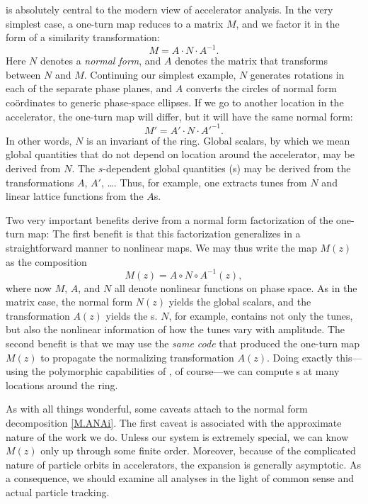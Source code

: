 %
 is absolutely central
to the modern view of accelerator analysis. In the very simplest
case, a one-turn map reduces to a matrix $M$, and we factor it in
the form of a similarity transformation:
\begin{equation*}
  M = A \cdot N \cdot A^{-1}.
\end{equation*}
Here $N$ denotes a \emph{normal form}, and $A$ denotes the matrix
that transforms between $N$ and $M$. Continuing our simplest example,
$N$ generates rotations in each of the separate phase planes,
and $A$ converts the circles of normal form co\"ordinates to
generic phase-space ellipses. If we go to another location in the
accelerator, the one-turn map will differ, but it will have the
same normal form:
\begin{equation*}
  M' = A' \cdot N \cdot A'^{-1}.
\end{equation*}
In other words, $N$ is an invariant of the ring.
Global scalars, by which we mean global quantities that do not
depend on location around the accelerator, may be derived from
$N$. The $s$-dependent global quantities (\SDGQ{}s) may be derived
from the transformations $A$, $A'$, \dots.
Thus, for example, one extracts tunes from $N$ and linear lattice
functions from the $A$s.

Two very important benefits derive from a normal form factorization
of the one-turn map: The first benefit is that this factorization
generalizes in a straightforward manner to nonlinear maps. We may
thus write the map $M(z)$ as the composition
\begin{equation}\label{eq:M.ANAi}
  M(z) = A \circ N \circ A^{-1}(z),
\end{equation}
where now $M$, $A$, and $N$ all denote nonlinear functions on phase
space. As in the matrix case, the normal form $N(z)$ yields the
global scalars, and the transformation $A(z)$ yields the \SDGQ{}s.
$N$, for example, contains not only the tunes, but also the nonlinear
information of how the tunes vary with amplitude. The second benefit
is that we may use the \emph{same code} that produced the one-turn
map $M(z)$ to propagate the normalizing transformation $A(z)$. Doing
exactly this---using the polymorphic capabilities of \PTC, of
course---we can compute \SDGQ{}s at many locations around the ring.

As with all things wonderful, some caveats attach to the normal
form decomposition \eqref{M.ANAi}. The first caveat is associated
with the approximate nature of the work we do. Unless our system
is extremely special, we can know $M(z)$ only up through some
finite order. Moreover, because of the complicated nature of
particle orbits in accelerators, the expansion is generally
asymptotic. As a consequence, we should examine all analyses in
the light of common sense and actual particle tracking.%

